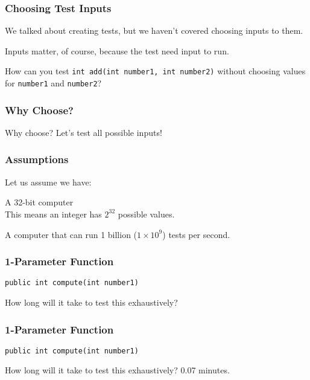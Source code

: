 \begin{frame}
\frametitle{Choosing Test Inputs}
\begin{changemargin}{1cm}
We talked about creating tests, but we haven't covered choosing inputs to them.

Inputs matter, of course, because the test need input to run.

How can you test \texttt{int add(int number1, int number2)} without choosing values for
\texttt{number1} and \texttt{number2}?
\end{changemargin}
\end{frame}

\begin{frame}
\frametitle{Why Choose?}
\begin{changemargin}{1cm}

Why choose? Let's test all possible inputs!


\end{changemargin}
\end{frame}


\begin{frame}
\frametitle{Assumptions}
\begin{changemargin}{1cm}
Let us assume we have:

A 32-bit computer\\
	\quad This means an integer has $2^{32}$ possible values.

A computer that can run 1 billion ($1\times10^{9}$) tests per second.

\end{changemargin}
\end{frame}


\begin{frame}
\frametitle{1-Parameter Function}
\begin{changemargin}{1cm}

\texttt{public int compute(int number1)}

How long will it take to test this exhaustively?

\end{changemargin}
\end{frame}

\begin{frame}
\frametitle{1-Parameter Function}
\begin{changemargin}{1cm}

\texttt{public int compute(int number1)}

How long will it take to test this exhaustively? \alert{0.07 minutes}.

\end{changemargin}
\end{frame}

